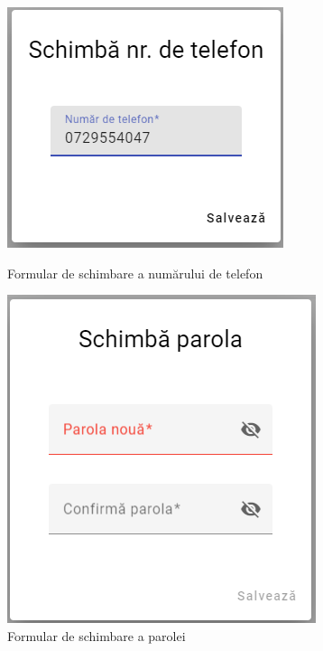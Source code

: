 \documentclass[12pt,a4paper]{report}
\theoremstyle{definition}
\theoremstyle{remark}
\begin{document}
\begin{figure}[H]
    \centering
    \begin{minipage}{.5\textwidth}
        \centering
        \includegraphics[width=.7\linewidth]{resurse/ghid_utilizare/change_phone_number.png}
        \caption{Formular de schimbare a numărului de telefon}

    \end{minipage}%
    \begin{minipage}{.5\textwidth}
        \centering
        \includegraphics[width=.8\linewidth]{resurse/ghid_utilizare/schimbare_parola.png}
        \caption{Formular de schimbare a parolei }

    \end{minipage}
\end{figure}
\end{document}
